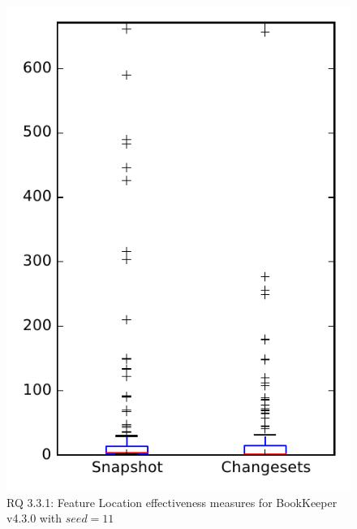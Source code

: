 
\begin{figure}
\centering
\includegraphics[height=0.4\textheight]{figures/flt_seed/rq1_bookkeeper_11}
\caption{RQ 3.3.1: Feature Location effectiveness measures for BookKeeper v4.3.0 with $seed=11$}
\label{fig:flt_seed:rq1:bookkeeper}
\end{figure}
